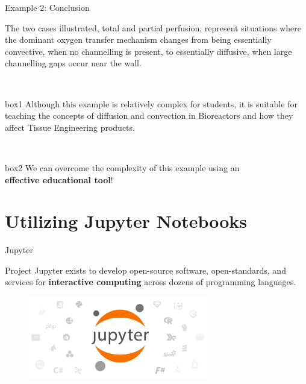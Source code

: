 \documentclass[11pt,t]{beamer}
\begin{document}
\begin{frame}[fragile]{Example 2: Conclusion}  

	The two cases illustrated, total and partial perfusion, represent situations where the dominant oxygen transfer mechanism changes from being essentially convective, when no channelling is present, to essentially diffusive, when large channelling gaps
occur near the wall.

	\begin{center}~
		\begin{beamercolorbox}[wd=.7\textwidth,sep=4pt,center]{box1}
Although this example is relatively complex for students, it is suitable for teaching the concepts of diffusion and convection in Bioreactors and how they affect Tissue Engineering products.
		\end{beamercolorbox}
	\end{center}
	
	\begin{center}~
		\begin{beamercolorbox}[wd=0.8\textwidth,sep=4pt,center]{box2}	
		We can overcome the complexity of this example using an\\ \textbf{effective educational tool}!
		\end{beamercolorbox}
	\end{center}
		
\end{frame}


\section{Utilizing Jupyter Notebooks}


\begin{frame}[fragile]{Jupyter}  
			
			Project Jupyter exists to develop open-source software, open-standards, and services for \textbf{interactive computing} across dozens of programming languages.

			\begin{figure}
			\centering
			\includegraphics[width=0.7\textwidth]{jupyter}
			
			\end{figure}
\end{frame}
\end{document}
